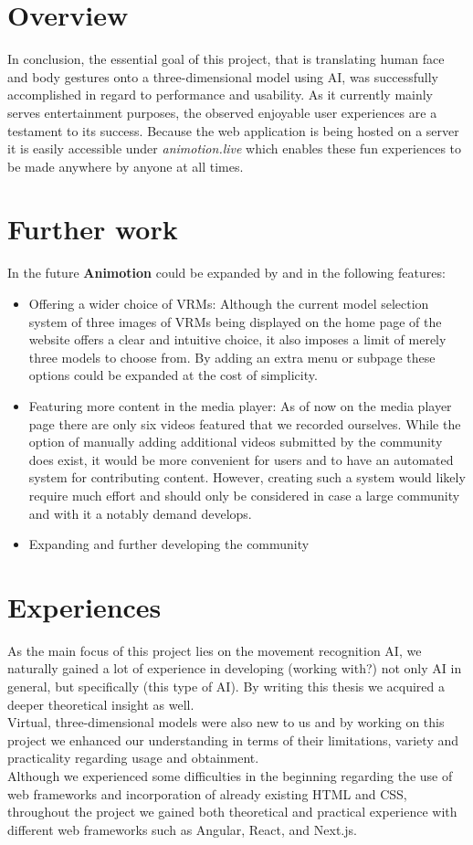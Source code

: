 \section{Overview}
In conclusion, the essential goal of this project, that is translating human face and body gestures onto 
a three-dimensional model using AI, was successfully accomplished in regard to performance and usability. 
As it currently mainly serves entertainment purposes, the observed enjoyable user experiences are a testament
to its success. Because the web application is being hosted on a server it is easily accessible under
\emph{animotion.live} which enables these fun experiences to be made anywhere by anyone at all times.

\section{Further work}
In the future \textbf{Animotion} could be expanded by and in the following features:
\begin{itemize}
    \item Offering a wider choice of VRMs: Although the current model selection system of three images of VRMs
    being displayed on the home page of the website offers a clear and intuitive choice, it also imposes a limit
    of merely three models to choose from. By adding an extra menu or subpage these options could be expanded at
    the cost of simplicity.
    \item Featuring more content in the media player: As of now on the media player page there are only six videos 
    featured that we recorded ourselves. While the option of manually adding additional videos submitted by the 
    community does exist, it would be more convenient for users and to have an automated system for contributing content. 
    However, creating such a system would likely require much effort and should only be considered in case a large 
    community and with it a notably demand develops.
    \item Expanding and further developing the community
\end{itemize}

\section{Experiences}
As the main focus of this project lies on the movement recognition AI, we naturally gained a lot of experience in developing
(working with?) not only AI in general, but specifically (this type of AI). By writing this thesis we acquired a deeper
theoretical insight as well. \\
Virtual, three-dimensional models were also new to us and by working on this project we enhanced our understanding in terms
of their limitations, variety and practicality regarding usage and obtainment. \\
Although we experienced some difficulties in the beginning regarding the use of web frameworks and incorporation of already
existing HTML and CSS, throughout the project we gained both theoretical and practical experience with different web frameworks
such as Angular, React, and Next.js.